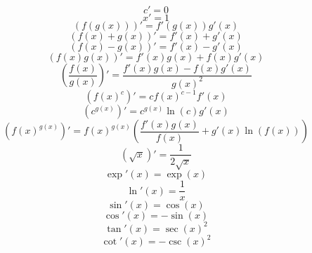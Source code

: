 \documentclass{article}
\begin{document}
    \begin{equation}
        c'=0
    \end{equation}
    \begin{equation}
        x'=1
    \end{equation}
    \begin{equation}
        (f(g(x)))'=f'(g(x))g'(x)
    \end{equation}
    \begin{equation}
        (f(x)+g(x))'=f'(x)+g'(x)
    \end{equation}
    \begin{equation}
        (f(x)-g(x))'=f'(x)-g'(x)
    \end{equation}
    \begin{equation}
        (f(x)g(x))'=f'(x)g(x)+f(x)g'(x)
    \end{equation}
    \begin{equation}
        \left(\frac{f(x)}{g(x)}\right)'=\frac{f'(x)g(x)-f(x)g'(x)}{g(x)^2}
    \end{equation}
    \begin{equation}
        \left(f(x)^c\right)'=cf(x)^{c-1}f'(x)
    \end{equation}
    \begin{equation}
        \left(c^{g(x)}\right)'=c^{g(x)}\ln(c)g'(x)
    \end{equation}
    \begin{equation}
        \left(f(x)^{g(x)}\right)'=f(x)^{g(x)}\left(\frac{f'(x)g(x)}{f(x)}+g'(x)\ln(f(x))\right)
    \end{equation}
    \begin{equation}
        (\sqrt{x})'=\frac{1}{2\sqrt{x}}
    \end{equation}
    \begin{equation}
        \exp'(x)=\exp(x)
    \end{equation}
    \begin{equation}
        \ln'(x)=\frac{1}{x}
    \end{equation}
    \begin{equation}
        \sin'(x)=\cos(x)
    \end{equation}
    \begin{equation}
        \cos'(x)=-\sin(x)
    \end{equation}
    \begin{equation}
        \tan'(x)=\sec(x)^2
    \end{equation}
    \begin{equation}
        \cot'(x)=-\csc(x)^2
    \end{equation}
\end{document}
